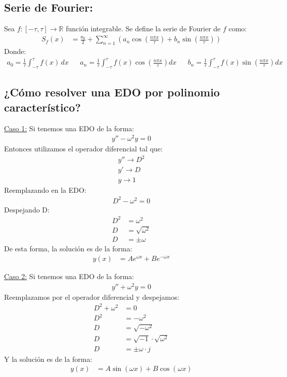 \documentclass[
  11pt,
  letterpaper,
   answers
  ]{exam}
\begin{document}
\subsection*{Serie de Fourier:} Sea $f : [-\tau , \tau] \rightarrow \mathbb{R}$ función integrable. Se define la serie de Fourier de $f$ como:
\begin{align}
    S_f(x) &= \frac{a_0}{2} + \sum_{n=1}^\infty (a_n \cos{(\frac{n \pi x}{\tau})} + b_n \sin{(\frac{n \pi x}{\tau})})
\end{align}
Donde:
\begin{align}
    a_0 = \frac{1}{\tau} \int_{-\tau}^\tau f(x)\, dx && a_n = \frac{1}{\tau} \int_{-\tau}^\tau f(x) \cos\!\left(\frac{n \pi x}{\tau}\right) dx && b_n = \frac{1}{\tau} \int_{-\tau}^\tau f(x) \sin\!\left(\frac{n \pi x}{\tau}\right) dx
\end{align}
\vspace{0.2cm}

\subsection*{¿Cómo resolver una EDO por polinomio característico?}
\underline{Caso 1:}
Si tenemos una EDO de la forma:
\begin{align}
    y'' - \omega^2 y = 0
\end{align}
Entonces utilizamos el operador diferencial tal que:
\begin{align}
    y'' \rightarrow D^2 \\
    y' \rightarrow D \\ 
    y \rightarrow 1
\end{align}
Reemplazando en la EDO:
\begin{align}
    D^2 - \omega^2 = 0
\end{align}
Despejando D:
\begin{align}
     D^2 &= \omega^2 \\
     D &= \sqrt{\omega^2} \\
     D &= \pm \omega
\end{align}
De esta forma, la solución es de la forma:
\begin{align}
    y(x) &= Ae^{\omega x} + Be^{-\omega x}
\end{align}

\underline{Caso 2:}
Si tenemos una EDO de la forma:
\begin{align}
    y'' + \omega^2 y = 0
\end{align}
Reemplazamos por el operador diferencial y despejamos:
\begin{align}
    D^2 + \omega^2 &= 0 \\
    D^2 &= -\omega^2 \\
    D &= \sqrt{-\omega^2} \\
    D &= \sqrt{-1} \cdot \sqrt{\omega^2} \\
    D &= \pm \omega \cdot j
\end{align}
Y la solución es de la forma:
\begin{align}
    y(x) &= A \sin{(\omega x)} + B \cos{(\omega x)}
\end{align}
\vspace{0.2cm}
\end{document}

